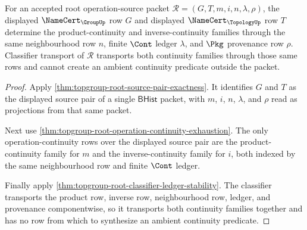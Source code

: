 \begin{theorem}
\label{thm:topgroup-root-operation-source-continuity-coupling}
For an accepted root operation-source packet
$\mathcal R=(G,T,m,i,n,\lambda,\rho)$, the displayed
$\NameCert_{\GroupUp}$ row $G$ and displayed $\NameCert_{\TopologyUp}$ row $T$
determine the product-continuity and inverse-continuity families through the
same neighbourhood row $n$, finite $\Cont$ ledger $\lambda$, and $\Pkg$
provenance row $\rho$. Classifier transport of $\mathcal R$ transports both
continuity families through those same rows and cannot create an ambient
continuity predicate outside the packet.
\end{theorem}
\begin{proof}
Apply \autoref{thm:topgroup-root-source-pair-exactness}. It identifies $G$ and
$T$ as the displayed source pair of a single $\mathsf{BHist}$ packet, with
$m$, $i$, $n$, $\lambda$, and $\rho$ read as projections from that same packet.

Next use \autoref{thm:topgroup-root-operation-continuity-exhaustion}. The only
operation-continuity rows over the displayed source pair are the
product-continuity family for $m$ and the inverse-continuity family for $i$,
both indexed by the same neighbourhood row and finite $\Cont$ ledger.

Finally apply \autoref{thm:topgroup-root-classifier-ledger-stability}. The
classifier transports the product row, inverse row, neighbourhood row, ledger,
and provenance componentwise, so it transports both continuity families
together and has no row from which to synthesize an ambient continuity
predicate.
\end{proof}
